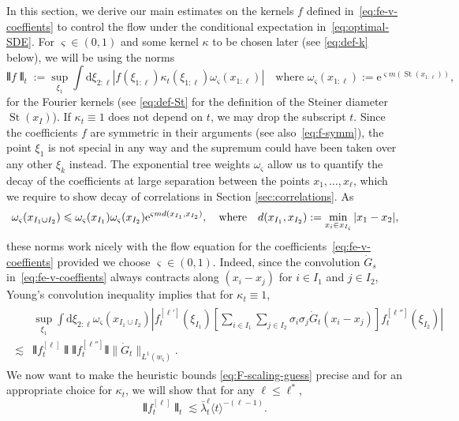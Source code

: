 \documentclass[11pt, a4paper]{scrartcl}
\numberwithin{equation}{section}
\theoremstyle{plain}
\theoremstyle{remark}
\newcommand{\assign}{:=}
\newcommand{\mathd}{\mathrm{d}}
\newcommand{\mathe}{\mathrm{e}}
\newcommand{\tmop}[1]{\ensuremath{\operatorname{#1}}}
\begin{document}
In this section, we derive our main estimates on the kernels $f$ defined
in~\eqref{eq:fe-v-coeffients} to control the flow under the conditional
expectation in~\eqref{eq:optimal-SDE}. For $\varsigma \in (0, 1)$ and some
kernel $\kappa$ to be chosen later (see \eqref{eq:def-k} below), we will be using
the norms
\begin{equation}
  \interleave f \interleave_t \assign \sup_{\xi_1}  \int \mathd \xi_{2 : \ell}
  | f (\xi_{1 : \ell}) \kappa_t (\xi_{1 : \ell}) \omega_{\varsigma} (x_{1 : \ell})
  |  \quad \text{where } \omega_{\varsigma} (x_{1 : \ell}) \assign
  \mathe^{\varsigma m (\tmop{St} (x_{1 : \ell}))}, \label{eq:def-exp-St}
\end{equation}
for the Fourier kernels (see \eqref{eq:def-St} for the definition of the
Steiner diameter $\tmop{St} (x_I)$). If $\kappa_t \equiv 1$ does not depend on $t$,
we may drop the subscript $t$. Since the coefficients $f$ are symmetric in
their arguments (see also~\eqref{eq:f-symm}), the point $\xi_1$ is not special in any way
and the supremum could have been taken over any other $\xi_k$ instead. The
exponential tree weights $\omega_{\varsigma}$ allow us to quantify the decay
of the coefficients at large separation between the points $x_1, \ldots,
x_{\ell}$, which we require to show decay of correlations in Section
\ref{sec:correlations}. As
\[ \omega_{\varsigma} (x_{I_1 \cup I_2}) \leqslant \omega_{\varsigma}
   (x_{I_1}) \omega_{\varsigma} (x_{I_2}) \mathe^{\varsigma m d (x_{I_1},
   x_{I_2})}, \quad \text{where\quad} d (x_{I_1}, x_{I_2}) \assign \min_{x_i
   \in x_{I_i}} | x_1 - x_2 |, \]
these norms work nicely with the flow equation for the
coefficients~\eqref{eq:fe-v-coeffients} provided we choose $\varsigma \in (0,
1)$. Indeed, since the convolution $\dot{G}_s$ in~\eqref{eq:fe-v-coeffients}
always contracts along $(x_i - x_j)$ for $i \in I_1$ and $j \in I_2$, Young's
convolution inequality implies that for $\kappa_t \equiv 1$,
\begin{align}
  \begin{split}
  &\sup_{\xi_1}  \int \mathd \xi_{2 : \ell} \omega_{\varsigma} (x_{I_1 \cup
  I_2}) \left| f^{[\ell']}_t (\xi_{I_1}) \left[ \sum_{i \in I_1} \sum_{j \in
  I_2} \sigma_i \sigma_j  \dot{G}_t (x_i - x_j) \right] f^{[\ell'']}_t
  (\xi_{I_2}) \right| \\
  \lesssim &\interleave f_t^{[\ell]} \interleave 
  \interleave f_t^{[\ell'']} \interleave  \| \dot{G}_t \|_{L^1
  (w_{\varsigma})} . \label{eq:fe-young-ineq}
  \end{split}
\end{align}
We now want to make the heuristic bounds \eqref{eq:F-scaling-guess} precise and for an appropriate choice
for $\kappa_t$, we will show that for any $\ell\leqslant \ell^\ast$,
\begin{equation}
  \interleave f_t^{[\ell]} \interleave_t
\lesssim \bar{\lambda}_t^{\ell}\langle t\rangle^{-(\ell-1)}\label{eq:f-ell-all}.
\end{equation}
\end{document}
